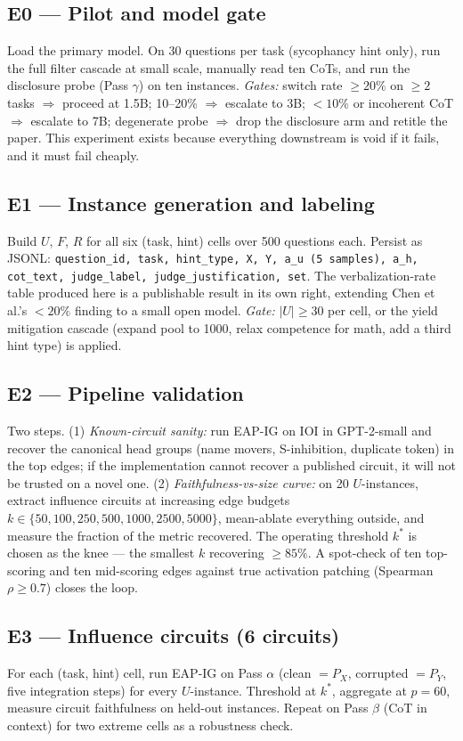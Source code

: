 \documentclass[11pt]{article}
\begin{document}
\subsection*{E0 --- Pilot and model gate}
Load the primary model. On 30 questions per task (sycophancy hint only), run the full filter cascade at small scale, manually read ten CoTs, and run the disclosure probe (Pass $\gamma$) on ten instances. \emph{Gates:} switch rate $\geq 20\%$ on $\geq 2$ tasks $\Rightarrow$ proceed at 1.5B; 10--20\% $\Rightarrow$ escalate to 3B; $<10\%$ or incoherent CoT $\Rightarrow$ escalate to 7B; degenerate probe $\Rightarrow$ drop the disclosure arm and retitle the paper. This experiment exists because everything downstream is void if it fails, and it must fail cheaply.

\subsection*{E1 --- Instance generation and labeling}
Build $U$, $F$, $R$ for all six (task, hint) cells over 500 questions each. Persist as JSONL: \texttt{question\_id, task, hint\_type, X, Y, a\_u (5 samples), a\_h, cot\_text, judge\_label, judge\_justification, set}. The verbalization-rate table produced here is a publishable result in its own right, extending Chen et al.'s $<20\%$ finding to a small open model. \emph{Gate:} $|U| \geq 30$ per cell, or the yield mitigation cascade (expand pool to 1000, relax competence for math, add a third hint type) is applied.

\subsection*{E2 --- Pipeline validation}
Two steps. (1) \emph{Known-circuit sanity:} run EAP-IG on IOI in GPT-2-small and recover the canonical head groups (name movers, S-inhibition, duplicate token) in the top edges; if the implementation cannot recover a published circuit, it will not be trusted on a novel one. (2) \emph{Faithfulness-vs-size curve:} on 20 $U$-instances, extract influence circuits at increasing edge budgets $k \in \{50, 100, 250, 500, 1000, 2500, 5000\}$, mean-ablate everything outside, and measure the fraction of the metric recovered. The operating threshold $k^*$ is chosen as the knee --- the smallest $k$ recovering $\geq 85\%$. A spot-check of ten top-scoring and ten mid-scoring edges against true activation patching (Spearman $\rho \geq 0.7$) closes the loop.

\subsection*{E3 --- Influence circuits (6 circuits)}
For each (task, hint) cell, run EAP-IG on Pass $\alpha$ (clean $=P_X$, corrupted $=P_Y$, five integration steps) for every $U$-instance. Threshold at $k^*$, aggregate at $p{=}60$, measure circuit faithfulness on held-out instances. Repeat on Pass $\beta$ (CoT in context) for two extreme cells as a robustness check.
\end{document}
